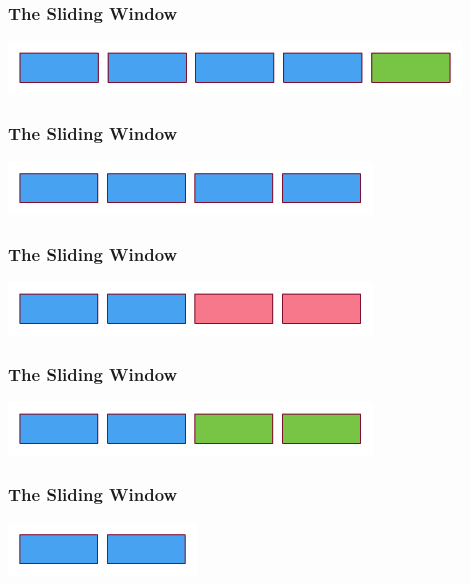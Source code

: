 \documentclass[pdftex]{beamer} %
\begin{document}
\begin{frame}[fragile]
  \frametitle{The Sliding Window}
\centering
\includegraphics[width=0.9\textwidth]{../../figures/sliding-window-3.pdf}
\end{frame}

\begin{frame}[fragile]
  \frametitle{The Sliding Window}
\centering
\includegraphics[width=0.725\textwidth]{../../figures/sliding-window-4.pdf}
\end{frame}

\begin{frame}[fragile]
  \frametitle{The Sliding Window}
\centering
\includegraphics[width=0.725\textwidth]{../../figures/sliding-window-5.pdf}
\end{frame}

\begin{frame}[fragile]
  \frametitle{The Sliding Window}
\centering
\includegraphics[width=0.725\textwidth]{../../figures/sliding-window-6.pdf}
\end{frame}

\begin{frame}[fragile]
  \frametitle{The Sliding Window}
\centering
\includegraphics[width=0.375\textwidth]{../../figures/sliding-window-7.pdf}
\end{frame}
\end{document}
